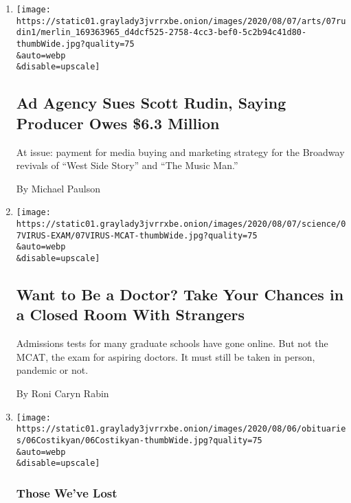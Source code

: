 \begin{enumerate}
\def\labelenumi{\arabic{enumi}.}
\item
  \href{/2020/08/07/theater/scott-rudin-spotco-broadway-lawsuit.html}{}

  \texttt{[image: https://static01.graylady3jvrrxbe.onion/images/2020/08/07/arts/07rudin1/merlin\_169363965\_d4dcf525-2758-4cc3-bef0-5c2b94c41d80-thumbWide.jpg?quality=75\\\&auto=webp\\\&disable=upscale]}

  \hypertarget{ad-agency-sues-scott-rudin-saying-producer-owes-63-million}{%
  \subsection{Ad Agency Sues Scott Rudin, Saying Producer Owes \$6.3
  Million}\label{ad-agency-sues-scott-rudin-saying-producer-owes-63-million}}

  At issue: payment for media buying and marketing strategy for the
  Broadway revivals of ``West Side Story'' and ``The Music Man.''

  By Michael Paulson
\item
  \href{/2020/08/07/health/coronavirus-exams-mcat.html}{}

  \texttt{[image: https://static01.graylady3jvrrxbe.onion/images/2020/08/07/science/07VIRUS-EXAM/07VIRUS-MCAT-thumbWide.jpg?quality=75\\\&auto=webp\\\&disable=upscale]}

  \hypertarget{want-to-be-a-doctor-take-your-chances-in-a-closed-room-with-strangers}{%
  \subsection{Want to Be a Doctor? Take Your Chances in a Closed Room
  With
  Strangers}\label{want-to-be-a-doctor-take-your-chances-in-a-closed-room-with-strangers}}

  Admissions tests for many graduate schools have gone online. But not
  the MCAT, the exam for aspiring doctors. It must still be taken in
  person, pandemic or not.

  By Roni Caryn Rabin
\item
  \href{/2020/08/07/obituaries/barbara-costikyan-dead-coronavirus.html}{}

  \texttt{[image: https://static01.graylady3jvrrxbe.onion/images/2020/08/06/obituaries/06Costikyan/06Costikyan-thumbWide.jpg?quality=75\\\&auto=webp\\\&disable=upscale]}

  \hypertarget{those-weve-lost}{%
  \subsubsection{Those We've Lost}\label{those-weve-lost}}


\end{enumerate}
